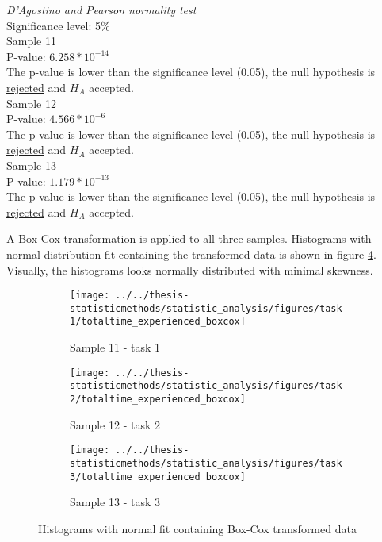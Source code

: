   \begin{center}
 	\begin{tcolorbox}[box align=center,width=\textwidth-5cm]
 		\centering
 		\textit{D'Agostino and Pearson normality test}\\
 		Significance level: 5\%  \\[0.5cm]
 		
 		Sample 11 \\
 		P-value: $6.258 * 10^{-14}$\\
 		The p-value is lower than the significance level (0.05), the null hypothesis is \underline{rejected} and $H_A$ accepted.\\[0.5cm]
 		
 		Sample 12 \\
 		P-value: $4.566 * 10^{-6}$ \\
		The p-value is lower than the significance level (0.05), the null hypothesis is \underline{rejected} and $H_A$ accepted.\\[0.5cm]
 		
 		Sample 13 \\
 		P-value: $1.179 * 10^{-13}$ \\
 		The p-value is lower than the significance level (0.05), the null hypothesis is \underline{rejected} and $H_A$ accepted.\\[0.5cm]
 	\end{tcolorbox} 
 \end{center}

A Box-Cox transformation is applied to all three samples. Histograms with normal distribution fit containing the transformed data is shown in figure \ref{fig:sample11_12_13_boxcox_histogram}. Visually, the histograms looks normally distributed with minimal skewness. \\

\begin{figure}[H]
	\centering
	\begin{subfigure}[b]{0.32\textwidth}
		\centering
		\texttt{[image: ../../thesis-statisticmethods/statistic\_analysis/figures/task1/totaltime\_experienced\_boxcox]}
		\caption{Sample 11 - task 1}
		\label{fig:totaltimeexperiencedboxcox_task1}
	\end{subfigure}
	\begin{subfigure}[b]{0.32\textwidth}
		\centering
		\texttt{[image: ../../thesis-statisticmethods/statistic\_analysis/figures/task2/totaltime\_experienced\_boxcox]}
		\caption{Sample 12 - task 2}
		\label{fig:totaltimeexperiencedboxcox_task2}
	\end{subfigure}
	\begin{subfigure}[b]{0.32\textwidth}
		\centering
		\texttt{[image: ../../thesis-statisticmethods/statistic\_analysis/figures/task3/totaltime\_experienced\_boxcox]}
		\caption{Sample 13 - task 3}
		\label{fig:totaltimeexperiencedboxcox_task3}
	\end{subfigure}
	\caption{Histograms with normal fit containing Box-Cox transformed data}
	\label{fig:sample11_12_13_boxcox_histogram}
\end{figure}

